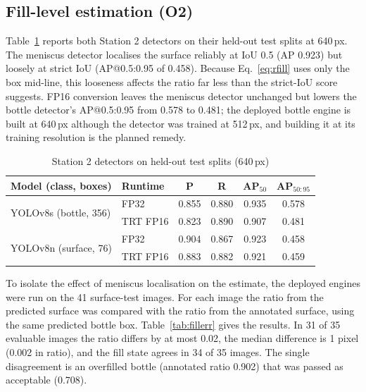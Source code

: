 \subsection{Fill-level estimation (O2)}
\label{sec:res-fill}
Table~\ref{tab:filldet} reports both Station 2 detectors on their held-out test splits at 640\,px. The meniscus detector localises the surface reliably at IoU 0.5 (AP 0.923) but loosely at strict IoU (AP@0.5:0.95 of 0.458). Because Eq.~\eqref{eq:rfill} uses only the box mid-line, this looseness affects the ratio far less than the strict-IoU score suggests. FP16 conversion leaves the meniscus detector unchanged but lowers the bottle detector's AP@0.5:0.95 from 0.578 to 0.481; the deployed bottle engine is built at 640\,px although the detector was trained at 512\,px, and building it at its training resolution is the planned remedy.

\begin{table}[htbp]
\centering
\caption{Station 2 detectors on held-out test splits (640\,px)}
\label{tab:filldet}
\begin{tabular}{|l|l|c|c|c|c|}
\hline
\textbf{Model (class, boxes)} & \textbf{Runtime} & \textbf{P} & \textbf{R} & \textbf{AP$_{50}$} & \textbf{AP$_{50:95}$} \\ \hline
\multirow{2}{*}{YOLOv8s (bottle, 356)} & FP32 & 0.855 & 0.880 & 0.935 & 0.578 \\ \cline{2-6}
 & TRT FP16 & 0.823 & 0.890 & 0.907 & 0.481 \\ \hline
\multirow{2}{*}{YOLOv8n (surface, 76)} & FP32 & 0.904 & 0.867 & 0.923 & 0.458 \\ \cline{2-6}
 & TRT FP16 & 0.883 & 0.882 & 0.921 & 0.459 \\ \hline
\end{tabular}
\end{table}

To isolate the effect of meniscus localisation on the estimate, the deployed engines were run on the 41 surface-test images. For each image the ratio from the predicted surface was compared with the ratio from the annotated surface, using the same predicted bottle box. Table~\ref{tab:fillerr} gives the results. In 31 of 35 evaluable images the ratio differs by at most 0.02, the median difference is 1 pixel (0.002 in ratio), and the fill state agrees in 34 of 35 images. The single disagreement is an overfilled bottle (annotated ratio 0.902) that was passed as acceptable (0.708).

